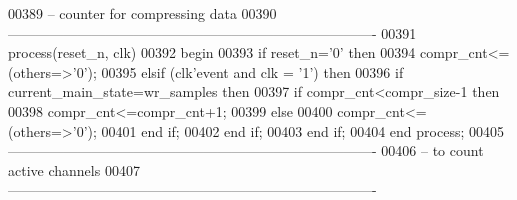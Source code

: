 \begin{DoxyCode}
00389 \textcolor{keyword}{-- counter for compressing data}
00390 \textcolor{keyword}{-------------------------------------------------------------------------------   }
00391       \textcolor{keywordflow}{process}(reset_n, clk)
00392 \textcolor{vhdlkeyword}{    begin}
00393       \textcolor{keywordflow}{if} \textcolor{vhdlchar}{reset_n}\textcolor{vhdlchar}{=}\textcolor{vhdlchar}{'}\textcolor{vhdllogic}{}\textcolor{vhdllogic}{0}\textcolor{vhdlchar}{'} \textcolor{keywordflow}{then}
00394           \textcolor{vhdlchar}{compr_cnt}\textcolor{vhdlchar}{<=}\textcolor{vhdlchar}{(}\textcolor{keywordflow}{others}\textcolor{vhdlchar}{=}\textcolor{vhdlchar}{>}\textcolor{vhdlchar}{'}\textcolor{vhdllogic}{}\textcolor{vhdllogic}{0}\textcolor{vhdlchar}{'}\textcolor{vhdlchar}{)};
00395         \textcolor{keywordflow}{elsif} \textcolor{vhdlchar}{(}\textcolor{vhdlchar}{clk}\textcolor{vhdlchar}{'}\textcolor{vhdlkeyword}{event} \textcolor{keywordflow}{and} \textcolor{vhdlchar}{clk} \textcolor{vhdlchar}{=} \textcolor{vhdlchar}{'}\textcolor{vhdllogic}{}\textcolor{vhdllogic}{1}\textcolor{vhdlchar}{'}\textcolor{vhdlchar}{)} \textcolor{keywordflow}{then}
00396           \textcolor{keywordflow}{if} \textcolor{vhdlchar}{current_main_state}\textcolor{vhdlchar}{=}\textcolor{vhdlchar}{wr\_samples} \textcolor{keywordflow}{then}
00397             \textcolor{keywordflow}{if} \textcolor{vhdlchar}{compr_cnt}\textcolor{vhdlchar}{<}\textcolor{vhdlchar}{compr_size}\textcolor{vhdlchar}{-}\textcolor{vhdllogic}{}\textcolor{vhdllogic}{1} \textcolor{keywordflow}{then}   
00398               \textcolor{vhdlchar}{compr_cnt}\textcolor{vhdlchar}{<=}\textcolor{vhdlchar}{compr_cnt}\textcolor{vhdlchar}{+}\textcolor{vhdllogic}{}\textcolor{vhdllogic}{1};
00399             \textcolor{keywordflow}{else} 
00400               \textcolor{vhdlchar}{compr_cnt}\textcolor{vhdlchar}{<=}\textcolor{vhdlchar}{(}\textcolor{keywordflow}{others}\textcolor{vhdlchar}{=}\textcolor{vhdlchar}{>}\textcolor{vhdlchar}{'}\textcolor{vhdllogic}{}\textcolor{vhdllogic}{0}\textcolor{vhdlchar}{'}\textcolor{vhdlchar}{)};
00401             \textcolor{keywordflow}{end} \textcolor{keywordflow}{if};
00402           \textcolor{keywordflow}{end} \textcolor{keywordflow}{if};
00403         \textcolor{keywordflow}{end} \textcolor{keywordflow}{if};
00404     \textcolor{keywordflow}{end} \textcolor{keywordflow}{process}; 
00405 \textcolor{keyword}{-------------------------------------------------------------------------------}
00406 \textcolor{keyword}{-- to count active channels}
00407 \textcolor{keyword}{-------------------------------------------------------------------------------    }

\end{DoxyCode}
